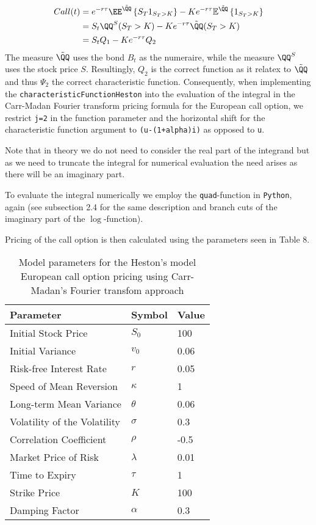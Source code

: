 \documentclass[12pt]{article}
\numberwithin{equation}{section}
\newcommand{\lc}{\left\{}
\newcommand{\rc}{\right\}}
\begin{document}
\begin{align*}
    Call(t)&=e^{-r\tau} \EE^{\tilde{\QQ}}\lc S_T 1_{S_T > K} \rc - K e^{-r\tau} \mathbb{E}^{\tilde{\QQ}} \lc 1_{S_T > K} \rc
    \\&=S_t\QQ^S(S_T>K)-Ke^{-r\tau}\tilde{\QQ}(S_T>K)\\
    &=S_tQ_1-Ke^{-r\tau}Q_2
\end{align*}
The measure $\tilde{\QQ}$ uses the bond $B_t$ as the numeraire, while the measure $\QQ^S$ uses the stock price $S$.
Resultingly, $Q_2$ is the correct function as it relatex to $\tilde{\QQ}$ and thus $\Psi_2$
the correct characteristic function.
Consequently, when implementing the \texttt{characteristicFunctionHeston} into
the evaluation of the integral in the Carr-Madan Fourier transform pricing
formula for the European call option, we restrict \texttt{j=2} in the function parameter and the
horizontal shift for the characteristic function argument to  \texttt{(u-(1+alpha)i)} as opposed to \texttt{u}.

Note that in theory we do not need to consider the real part of the integrand
but as we need to truncate the integral for numerical evaluation the need arises as there will be an
imaginary part. 

To evaluate the integral numerically we employ the \texttt{quad}-function in
\texttt{Python}, again (see subsection 2.4 for the same description and branch
cuts of the imaginary part of the $\log$-function).

Pricing of the call option is then calculated using the parameters seen in Table 8.
\begin{table}[!h]
    \centering
    \begin{tabular}{lll}
    \toprule
    \textbf{Parameter} & \textbf{Symbol} & \textbf{Value} \\
    \midrule
    Initial Stock Price & $S_0$ & 100 \\
    Initial Variance & $v_0$ & 0.06 \\
    Risk-free Interest Rate & $r$ & 0.05 \\
    Speed of Mean Reversion & $\kappa$ & 1 \\
    Long-term Mean Variance & $\theta$ & 0.06 \\
    Volatility of the Volatility & $\sigma$ & 0.3 \\
    Correlation Coefficient & $\rho$ & -0.5 \\
    Market Price of Risk & $\lambda$ & 0.01 \\
    Time to Expiry & $\tau$ & 1 \\
    Strike Price & $K$ & 100 \\
    Damping Factor & $\alpha$ & 0.3 \\
    \bottomrule
    \end{tabular}
    \caption{Model parameters for the Heston's model European call option pricing using Carr-Madan's Fourier transfom approach}
    \label{table:call_option_pricing_parameters4}
\end{table}
\end{document}
